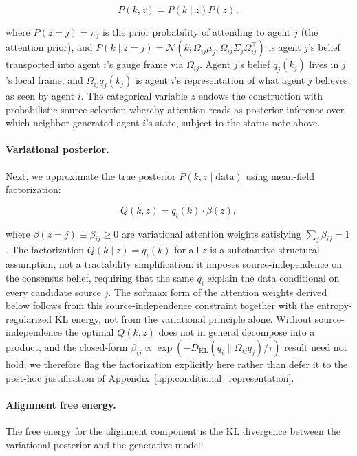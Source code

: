 \documentclass[11pt]{article}
\begin{document}
\begin{equation}
P(k, z) = P(k \mid z) P(z),
\label{eq:mixture_joint}
\end{equation}

where $P(z = j) = \pi_j$ is the prior probability of attending to agent $j$ (the attention prior), and $P(k \mid z = j) = \mathcal{N}(k; \Omega_{ij}\mu_j, \Omega_{ij}\Sigma_j\Omega_{ij}^\top)$ is agent $j$'s belief transported into agent $i$'s gauge frame via $\Omega_{ij}$. Agent $j$'s belief $q_j(k_j)$ lives in $j$'s local frame, and $\Omega_{ij}q_j(k_j)$ is agent $i$'s representation of what agent $j$ believes, as seen by agent $i$. The categorical variable $z$ endows the construction with probabilistic source selection whereby attention reads as posterior inference over which neighbor generated agent $i$'s state, subject to the status note above.

\paragraph{Variational posterior.}
Next, we approximate the true posterior $P(k, z \mid \text{data})$ using mean-field factorization:

\begin{equation}
Q(k, z) = q_i(k) \cdot \beta(z),
\label{eq:mixture_posterior}
\end{equation}

where $\beta(z = j) \equiv \beta_{ij} \geq 0$ are variational attention weights satisfying $\sum_j \beta_{ij} = 1$. The factorization $Q(k \mid z) = q_i(k)$ for all $z$ is a substantive structural assumption, not a tractability simplification: it imposes source-independence on the consensus belief, requiring that the same $q_i$ explain the data conditional on every candidate source $j$. The softmax form of the attention weights derived below follows from this source-independence constraint together with the entropy-regularized KL energy, not from the variational principle alone. Without source-independence the optimal $Q(k, z)$ does not in general decompose into a product, and the closed-form $\beta_{ij} \propto \exp(-D_{\mathrm{KL}}(q_i \| \Omega_{ij}q_j)/\tau)$ result need not hold; we therefore flag the factorization explicitly here rather than defer it to the post-hoc justification of Appendix~\ref{app:conditional_representation}.

\paragraph{Alignment free energy.}
The free energy for the alignment component is the KL divergence between the variational posterior and the generative model:
\end{document}

